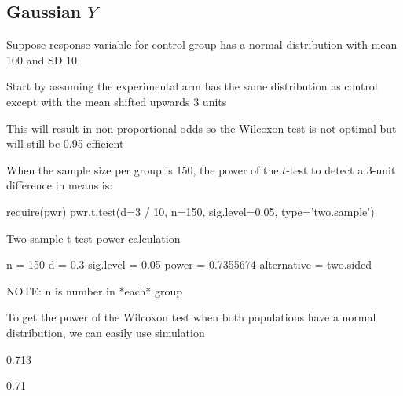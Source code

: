 \subsection{Gaussian $Y$}
\bi
\item Suppose response variable for control group has a normal distribution with mean 100 and SD 10
\item Start by assuming the experimental arm has the same distribution as control except with the mean shifted upwards 3 units
\item This will result in non-proportional odds so the Wilcoxon test is not optimal but will still be 0.95 efficient
\item When the sample size per group is 150, the power of the $t$-test to detect a 3-unit difference in means is:

\begin{Schunk}
\begin{Sinput}
require(pwr)
pwr.t.test(d=3 / 10, n=150, sig.level=0.05, type='two.sample')
\end{Sinput}
\begin{Soutput}

     Two-sample t test power calculation 

              n = 150
              d = 0.3
      sig.level = 0.05
          power = 0.7355674
    alternative = two.sided

NOTE: n is number in *each* group
\end{Soutput}
\end{Schunk}

\item To get the power of the Wilcoxon test when both populations have a normal distribution, we can easily use simulation

\begin{Schunk}
\begin{Soutput}
[1] 0.713
\end{Soutput}
\begin{Soutput}
[1] 0.71
\end{Soutput}
\end{Schunk}

